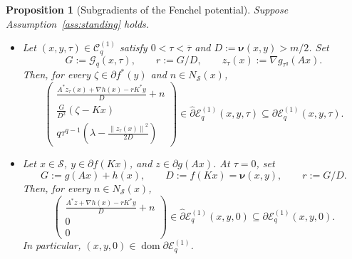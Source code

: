 \documentclass[9pt]{article}
\numberwithin{equation}{section}
\newtheorem{proposition}[theorem]{Proposition}
\theoremstyle{definition}
\theoremstyle{remark}
\newcommand{\Sset}{\mathcal S}
\newcommand{\whpartial}{\widehat\partial}
\newcommand{\norm}[1]{\left\lVert #1\right\rVert}
\newcommand{\Gcal}{\mathcal G}
\newcommand{\Ecal}{\mathcal E}
\newcommand{\Ccal}{\mathcal C}
\newcommand{\nuf}{\boldsymbol\nu}
\DeclareMathOperator{\dom}{dom}
\begin{document}
\begin{proposition}[Subgradients of the Fenchel potential]
\label{prop:E-subgradient2}
Suppose Assumption~\ref{ass:standing} holds.
\begin{itemize}
\item[(i)] Let $(x,y,\tau)\in\Ccal_q^{(1)}$ satisfy
$0<\tau<\overline\tau$ and $D:=\nuf(x,y)>m/2$. Set
\[
 G:=\Gcal_q(x,\tau),\qquad r:=G/D,\qquad
 z_\tau(x):=\nabla g_{\tau^q}(Ax).
\]
Then, for every $\zeta\in\partial f^*(y)$ and
$n\in N_{\Sset}(x)$,
\begin{equation}\label{eq:E-subgradient}
 \begin{pmatrix}
 \displaystyle\frac{A^*z_\tau(x)+\nabla h(x)-rK^*y}{D}+n\\[1.5ex]
 \displaystyle\frac{G}{D^2}(\zeta-Kx)\\[1.5ex]
 \displaystyle q\tau^{q-1}
       \left(\lambda-\frac{\norm{z_\tau(x)}^2}{2D}\right)
 \end{pmatrix}
 \in\whpartial\Ecal_q^{(1)}(x,y,\tau)
 \subseteq\partial\Ecal_q^{(1)}(x,y,\tau).
\end{equation}
\item[(ii)] Let $x\in\Sset$, $y\in\partial f(Kx)$,
and $z\in\partial g(Ax)$. At $\tau=0$, set
\[
 G:=g(Ax)+h(x),\qquad
 D:=f(Kx)=\nuf(x,y),\qquad r:=G/D.
\]
Then, for every $n\in N_{\Sset}(x)$,
\begin{equation}\label{eq:E-zero-subgradient2}
 \begin{pmatrix}
 \displaystyle\frac{A^*z+\nabla h(x)-rK^*y}{D}+n\\[1.5ex]
 0\\[1.5ex]0
 \end{pmatrix}
 \in\whpartial\Ecal_q^{(1)}(x,y,0)
 \subseteq\partial\Ecal_q^{(1)}(x,y,0).
\end{equation}
In particular, $(x,y,0)\in\dom\partial\Ecal_q^{(1)}$.
\end{itemize}
\end{proposition}
\end{document}
